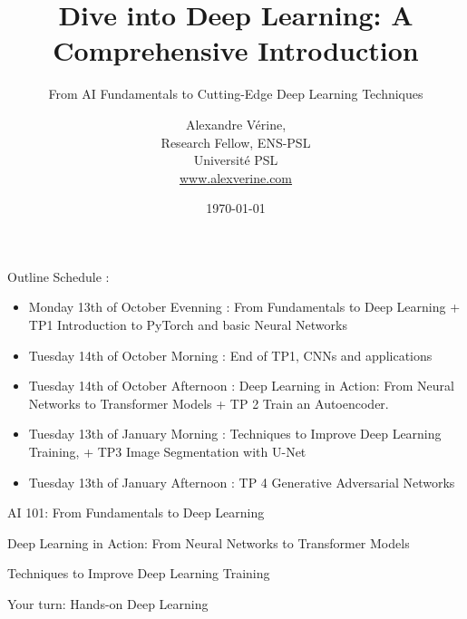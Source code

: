 \documentclass[
11pt,notheorems,hyperref={pdfauthor=whatever}
]{beamer}
\title[
Introduction to Deep Learning: Excutive Master - IASD
]{Dive into Deep Learning: A Comprehensive Introduction}
\subtitle{From AI Fundamentals to Cutting-Edge Deep Learning Techniques}
\author[
Alexandre V\'erine
]{
    Alexandre Vérine,\\
    Research Fellow, ENS-PSL\\
    Universit\'e PSL\\
    \url{www.alexverine.com}
}
\institute{
Executive Master IASD\\
    Universit\'e Paris-Dauphine, PSL}
\date{\today}
\begin{document}
{
\begin{frame}
    \titlepage
\end{frame}


\begin{frame}{Outline}
    Schedule :
    \begin{itemize}
        \item Monday 13th of October Evenning : From Fundamentals to Deep Learning + TP1 Introduction to PyTorch and basic Neural Networks
        \item Tuesday 14th of October Morning : End of TP1, CNNs and applications
        \item Tuesday 14th of October Afternoon : Deep Learning in Action: From Neural Networks to Transformer Models + TP 2 Train an Autoencoder.
        \item Tuesday 13th of January Morning : Techniques to Improve Deep Learning Training, + TP3 Image Segmentation with U-Net
        \item Tuesday 13th of January Afternoon : TP 4 Generative Adversarial Networks
    \end{itemize}
\end{frame}



}
\addtocounter{framenumber}{-2}

\begin{frame}{AI 101: From Fundamentals to Deep Learning}
    \tableofcontents[part=1]
\end{frame}
\begin{frame}{Deep Learning in Action: From Neural Networks to Transformer Models}
    \tableofcontents[part=2]
\end{frame}
\begin{frame}{Techniques to Improve Deep Learning Training}
    \tableofcontents[part=3]
\end{frame}


\begin{frame}{Your turn: Hands-on Deep Learning}
    \tableofcontents[part=4]
\end{frame}










% 



\end{document}
